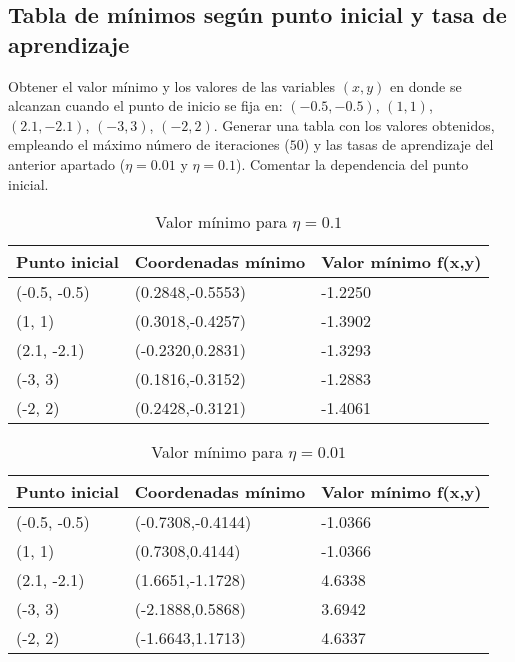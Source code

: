 

\subsection{Tabla de mínimos según punto inicial y tasa de aprendizaje}

Obtener el valor mínimo y los valores de las variables $(x, y)$ en donde se
alcanzan cuando el punto de inicio se fija en: $(-0.5, -0.5)$, $(1, 1)$, $(2.1,-2.1)$,
$(-3, 3)$, $(-2, 2)$.
Generar una tabla con los valores obtenidos, empleando el máximo número de
iteraciones ($50$) y las tasas de aprendizaje del anterior apartado ($\eta=0.01$ y 
$\eta = 0.1$). Comentar la dependencia del punto inicial.

\begin{table}[!ht]
    \caption {Valor mínimo para $\eta = 0.1$} \label{tab:title} 
    \centering
    \begin{tabular}{|l|l|l|}
    \hline
        Punto inicial & Coordenadas mínimo & Valor mínimo f(x,y) \\ \hline
        (-0.5, -0.5) & (0.2848,-0.5553) & -1.2250 \\ \hline
        (1, 1) & (0.3018,-0.4257) & -1.3902 \\ \hline
        (2.1, -2.1) & (-0.2320,0.2831) & -1.3293 \\ \hline
        (-3, 3) & (0.1816,-0.3152) & -1.2883 \\ \hline
        (-2, 2) & (0.2428,-0.3121) & -1.4061 \\ \hline
    \end{tabular}
\end{table}

\begin{table}[!ht]
    \caption {Valor mínimo para $\eta = 0.01$} \label{tab:title2} 
    \centering
    \begin{tabular}{|l|l|l|}
    \hline
        Punto inicial & Coordenadas mínimo & Valor mínimo f(x,y) \\ \hline
        (-0.5, -0.5) & (-0.7308,-0.4144) & -1.0366 \\ \hline
        (1, 1) & (0.7308,0.4144) & -1.0366 \\ \hline
        (2.1, -2.1) & (1.6651,-1.1728) & 4.6338 \\ \hline
        (-3, 3) & (-2.1888,0.5868) & 3.6942 \\ \hline
        (-2, 2) & (-1.6643,1.1713) & 4.6337 \\ \hline
    \end{tabular}
\end{table}

